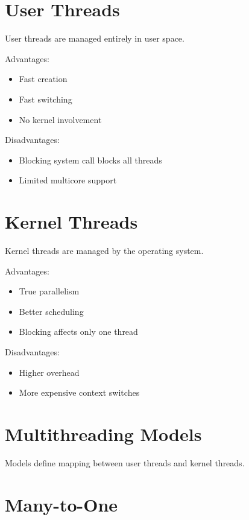 \section{User Threads}

User threads are managed entirely in user space.

Advantages:

\begin{itemize}
\item Fast creation
\item Fast switching
\item No kernel involvement
\end{itemize}

Disadvantages:

\begin{itemize}
\item Blocking system call blocks all threads
\item Limited multicore support
\end{itemize}

\section{Kernel Threads}

Kernel threads are managed by the operating system.

Advantages:

\begin{itemize}
\item True parallelism
\item Better scheduling
\item Blocking affects only one thread
\end{itemize}

Disadvantages:

\begin{itemize}
\item Higher overhead
\item More expensive context switches
\end{itemize}

\section{Multithreading Models}

Models define mapping between user threads and kernel threads.

\section{Many-to-One}

